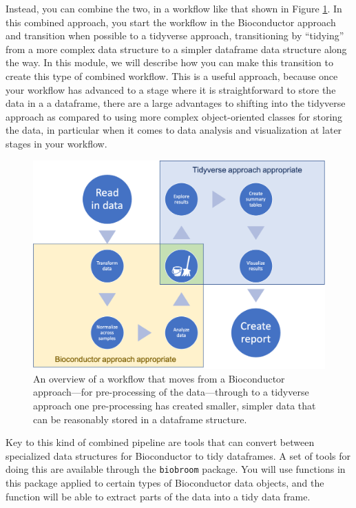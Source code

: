 \documentclass[]{tufte-book}
\begin{document}
Instead, you can combine the two, in a workflow like that shown in Figure
\ref{fig:combinedworkflow}. In this combined approach, you start the workflow
in the Bioconductor approach and transition when possible to a tidyverse
approach, transitioning by ``tidying'' from a more complex data structure to a
simpler dataframe data structure along the way. In this module, we will describe
how you can make this transition to create this type of combined workflow. This
is a useful approach, because once your workflow has advanced to a stage where
it is straightforward to store the data in a a dataframe, there are a large
advantages to shifting into the tidyverse approach as compared to using more
complex object-oriented classes for storing the data, in particular when it
comes to data analysis and visualization at later stages in your workflow.

\begin{figure}
\includegraphics[width=\textwidth]{figures/workflow} \caption[An overview of a workflow that moves from a Bioconductor approach---for pre-processing of the data---through to a tidyverse approach one pre-processing has created smaller, simpler data that can be reasonably stored in a dataframe structure]{An overview of a workflow that moves from a Bioconductor approach---for pre-processing of the data---through to a tidyverse approach one pre-processing has created smaller, simpler data that can be reasonably stored in a dataframe structure.}\label{fig:combinedworkflow}
\end{figure}

Key to this kind of combined pipeline are tools that can convert between
specialized data structures for Bioconductor to tidy dataframes. A set of tools
for doing this are available through the \texttt{biobroom} package. You will use
functions in this package applied to certain types of Bioconductor data objects,
and the function will be able to extract parts of the data into a tidy data
frame.
\end{document}
